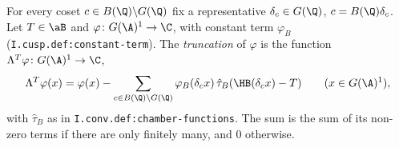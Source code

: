 For every coset $c\in B(\Q)\backslash G(\Q)$ fix a representative $\delta_c\in G(\Q)$, $c=B(\Q)\delta_c$. Let $T\in\aB$ and $\varphi\colon G(\A)^1\to\C$,
with constant term $\varphi_B$ (\texttt{I.cusp.def:constant-term}). The \emph{truncation} of $\varphi$ is the function $\Lambda^T\varphi\colon G(\A)^1\to\C$,
\[
  \Lambda^T\varphi(x)=\varphi(x)-\sum_{c\in B(\Q)\backslash G(\Q)}\varphi_B(\delta_cx)\,\hat\tau_B(\HB(\delta_cx)-T)\qquad(x\in G(\A)^1),
\]
with $\hat\tau_B$ as in \texttt{I.conv.def:chamber-functions}. The sum is the sum of its non-zero terms if there are only finitely many, and $0$ otherwise.
